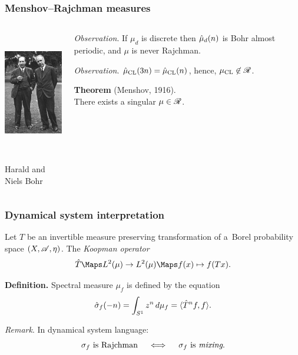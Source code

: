 \begin{frame}
  \frametitle{Menshov--Rajchman measures}

  \begin{columns}[t]
    \begin{column}{0.4\textwidth}
      \begin{center}
      \includegraphics[height=54mm]{Bohrs.jpeg}
      
      Harald and Niels Bohr 
      \end{center}
    \end{column}
    \begin{column}{0.6\textwidth} 
  
      {\it Observation}.
      If $\mu_d$ is discrete then $\Hat\mu_d(n)$ is Bohr almost periodic, and $\mu$ is never Rajchman.

      \bigskip
      {\it Observation}. $\Hat\mu_{\mathrm{CL}}(3n) = \Hat\mu_{\mathrm{CL}}(n)$, hence, $\mu_{\mathrm{CL}} \not\in \mathscr{R}$.
      
      \bigskip
      {\bf Theorem} (Menshov, 1916). \\ 
      There exists a singular $\mu \in \mathscr{R}$. 

    \end{column}
  \end{columns}
    
\end{frame}


\begin{frame}
  \frametitle{Dynamical system interpretation}

  Let $T$ be an invertible measure preserving transformation of a~Borel probability space $(X,\mathscr{A},\eta)$.
  The {\it Koopman operator\/}  
  $$\Hat T \Maps L^2(\mu) \to L^2(\mu) \Maps f(x) \mapsto f(Tx).$$
  
  \bigskip
  {\bf Definition.} Spectral measure $\mu_f$ is defined by the equation
  $$
    \Hat\sigma_f(-n) = \int_{S^1} z^n \,d\mu_f = \langle \Hat T^n f,f \rangle.
  $$
  
  \medskip
  {\it Remark}.
  In dynamical system language: 
  $$
    \sigma_f \text{ is Rajchman} \quad \iff \quad \sigma_f \text{ is {\it mixing}.}
  $$
  
\end{frame}



